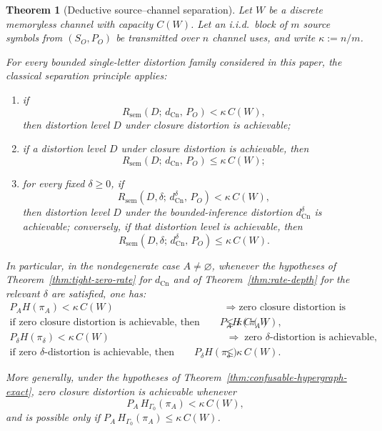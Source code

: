\documentclass[journal,onecolumn]{IEEEtran}
\newcommand{\Cn}{\text{Cn}}
\newtheorem{theorem}{Theorem}[section]
\numberwithin{equation}{section}
\begin{document}
\begin{theorem}[Deductive source--channel separation]
\label{thm:sem-source-channel}
Let \(W\) be a discrete memoryless channel with capacity \(C(W)\).
Let an i.i.d.\ block of \(m\) source symbols from
\((S_O,P_O)\) be transmitted over \(n\) channel uses, and write
\(\kappa:=n/m\).

For every bounded single-letter distortion family considered in
this paper, the classical separation principle applies:
\begin{enumerate}[label=\textup{(\roman*)}]
  \item if
        \[
          R_{\mathrm{sem}}(D;\,d_{\Cn},\,P_O)
          < \kappa\,C(W),
        \]
        then distortion level \(D\) under closure distortion is
        achievable;
  \item if a distortion level \(D\) under closure distortion is
        achievable, then
        \[
          R_{\mathrm{sem}}(D;\,d_{\Cn},\,P_O)
          \le \kappa\,C(W);
        \]
  \item for every fixed \(\delta\ge 0\), if
        \[
          R_{\mathrm{sem}}(D,\delta;\,d_{\Cn}^{\delta},\,P_O)
          < \kappa\,C(W),
        \]
        then distortion level \(D\) under the bounded-inference
        distortion \(d_{\Cn}^{\delta}\) is achievable; conversely,
        if that distortion level is achievable, then
        \[
          R_{\mathrm{sem}}(D,\delta;\,d_{\Cn}^{\delta},\,P_O)
          \le \kappa\,C(W).
        \]
\end{enumerate}

In particular, in the nondegenerate case \(A\neq\varnothing\), whenever
the hypotheses of Theorem~\ref{thm:tight-zero-rate} for
\(d_{\Cn}\) and of Theorem~\ref{thm:rate-depth} for the relevant
\(\delta\) are satisfied, one has:
\begin{align}
  P_AH(\pi_A) < \kappa\,C(W)
  &\;\Longrightarrow\;
  \text{zero closure distortion is achievable,}
  \label{eq:sep-zero-unconstrained-suf}\\
  \text{if zero closure distortion is achievable, then}\qquad
  P_AH(\pi_A) &\le \kappa\,C(W),
  \label{eq:sep-zero-unconstrained-nec}\\
  P_\delta H(\pi_\delta) < \kappa\,C(W)
  &\;\Longrightarrow\;
  \text{zero \(\delta\)-distortion is achievable,}
  \label{eq:sep-zero-depth-suf}\\
  \text{if zero \(\delta\)-distortion is achievable, then}\qquad
  P_\delta H(\pi_\delta) &\le \kappa\,C(W).
  \label{eq:sep-zero-depth-nec}
\end{align}

More generally, under the hypotheses of Theorem~\ref{thm:confusable-hypergraph-exact},
zero closure distortion is achievable whenever
\[
  P_A\,H_{\Gamma_0}(\pi_A) < \kappa\,C(W),
\]
and is possible only if \(P_A\,H_{\Gamma_0}(\pi_A)\le \kappa\,C(W)\).
\end{theorem}
\end{document}
